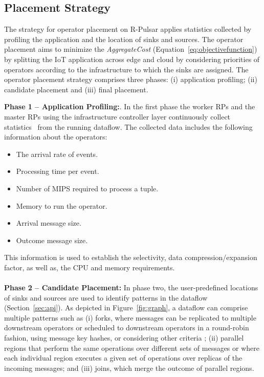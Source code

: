 \subsection{Placement Strategy}\label{sec:strategies}
The strategy for operator placement on R-Pulsar applies statistics collected by profiling the application and the location of sinks and sources. The operator placement aims to minimize the \textit{AggregateCost} (Equation~\ref{eq:objectivefunction}) by splitting the IoT application across edge and cloud by considering priorities of operators according to the infrastructure to which the sinks are assigned.
The operator placement strategy comprises three phases: (i) application profiling; (ii) candidate placement and (iii) final placement. 

\textbf{Phase 1 -- Application Profiling:}. 
In the first phase the worker RPs and the master RPs using the infrastructure controller layer continuously collect statistics~\cite{kaur:2017} from the running dataflow. The collected data includes the following information about the operators:
\begin{itemize}
  \item The arrival rate of events.
  \item Processing time per event.
  \item Number of MIPS required to process a tuple.
  \item Memory to run the operator.
  \item Arrival message size.
  \item Outcome message size.
\end{itemize}
This information is used to establish the selectivity, data compression/expansion factor, as well as, the CPU and memory requirements. 
\\
\\
\textbf{Phase 2 -- Candidate Placement:}
In phase two, the user-predefined locations of sinks and sources are used to identify patterns in the dataflow (Section~\ref{sec:api}). As depicted in Figure~\ref{fig:graph}, a dataflow can comprise multiple patterns such as (i) forks, where messages can be replicated to multiple downstream operators or scheduled to downstream operators in a round-robin fashion, using message key hashes, or considering other criteria \cite{Ni:2017}; (ii) parallel regions that perform the same operations over different sets of messages or where each individual region executes a given set of operations over replicas of the incoming messages; and (iii) joins, which merge the outcome of parallel regions. 

